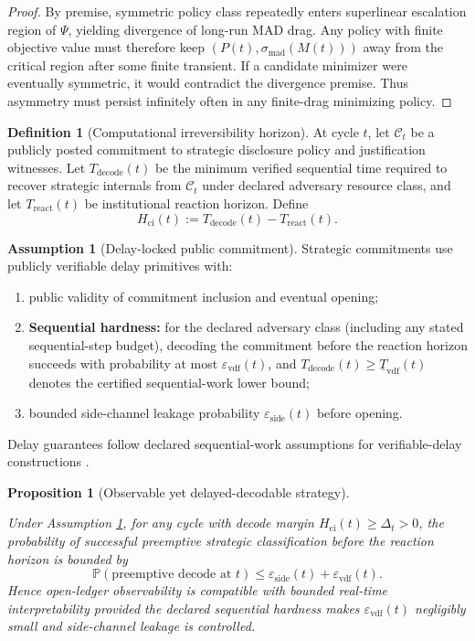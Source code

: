\documentclass[11pt,a4paper]{article}
\newcommand{\Prob}{\mathbb{P}}
\newcommand{\DependsOn}[1]{\par\noindent{\footnotesize\texttt{DependsOn: }\nolinkurl{#1}}\par}
\newcommand{\eps}{\varepsilon}
\newtheorem{proposition}{Proposition}
\theoremstyle{definition}
\newtheorem{definition}{Definition}
\newtheorem{assumption}{Assumption}
\theoremstyle{remark}
\begin{document}
\begin{proof}
By premise, symmetric policy class repeatedly enters superlinear escalation region of $\Psi$, yielding divergence of long-run MAD drag.
Any policy with finite objective value must therefore keep $(P(t),\sigma_{\mathrm{mad}}(M(t)))$ away from the critical region after some finite transient.
If a candidate minimizer were eventually symmetric, it would contradict the divergence premise.
Thus asymmetry must persist infinitely often in any finite-drag minimizing policy.
\end{proof}

\begin{definition}[Computational irreversibility horizon]\label{def:computational_irreversibility_horizon}
At cycle $t$, let $\mathcal C_t$ be a publicly posted commitment to strategic disclosure policy and justification witnesses.
Let $T_{\mathrm{decode}}(t)$ be the minimum verified sequential time required to recover strategic internals from $\mathcal C_t$ under declared adversary resource class, and let $T_{\mathrm{react}}(t)$ be institutional reaction horizon.
Define
\[
H_{\mathrm{ci}}(t):=T_{\mathrm{decode}}(t)-T_{\mathrm{react}}(t).
\]
\end{definition}

\begin{assumption}[Delay-locked public commitment]\label{ass:delaylock}
Strategic commitments use publicly verifiable delay primitives with:
\begin{enumerate}
  \item public validity of commitment inclusion and eventual opening;
  \item \textbf{Sequential hardness:} for the declared adversary class (including any stated sequential-step budget), decoding the commitment before the reaction horizon succeeds with probability at most $\eps_{\mathrm{vdf}}(t)$, and $T_{\mathrm{decode}}(t)\ge \underline T_{\mathrm{vdf}}(t)$ denotes the certified sequential-work lower bound;
  \item bounded side-channel leakage probability $\eps_{\mathrm{side}}(t)$ before opening.
\end{enumerate}
\noindent Delay guarantees follow declared sequential-work assumptions for verifiable-delay constructions \cite{Boneh2018VDF}.
\end{assumption}

\begin{proposition}[Observable yet delayed-decodable strategy]\label{prop:delayobs}
\DependsOn{global=foundation;refs=[ass:delaylock]}
Under Assumption \ref{ass:delaylock}, for any cycle with decode margin $H_{\mathrm{ci}}(t)\ge \Delta_t>0$, the probability of successful preemptive strategic classification \emph{before} the reaction horizon is bounded by
\[
\Prob(\text{preemptive decode at }t)\le \eps_{\mathrm{side}}(t)+\eps_{\mathrm{vdf}}(t).
\]
Hence open-ledger observability is compatible with bounded real-time interpretability provided the declared sequential hardness makes $\eps_{\mathrm{vdf}}(t)$ negligibly small and side-channel leakage is controlled.
\end{proposition}
\end{document}
